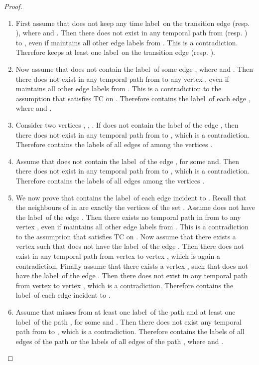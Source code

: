 \documentclass[a4paper,UKenglish]{article}
\begin{document}
\begin{proof}
\begin{enumerate}[label=(\alph*)]
\item First assume that  does not keep any time label~on
the transition edge  (resp. ), where  and . Then there does not exist in  any temporal path from 
 (resp. ) to , even if  maintains all other edge labels from . This is a
contradiction. Therefore  keeps at least one label~on the
transition edge  (resp. ).

\item Now assume that  does not contain the label~of some
edge , where  and . Then there does not exist in  any temporal path from  to any vertex , even if 
maintains all other edge labels from . This is a
contradiction to the assumption that  satisfies TC on . Therefore  contains the label~of each edge , where  and .

\item Consider two vertices , , . If  does not contain the label
of the edge , then there does not exist in  any temporal path from  to , which is a
contradiction. Therefore  contains the labels of all edges of  among the vertices .

\item Assume that  does not contain the label~of the edge , for some  and. Then there does not exist in  any temporal
path from  to , which is a contradiction.
Therefore  contains the labels of all edges among the vertices .

\item We now prove that  contains the label~of each edge
incident to . Recall that the neighbours of  in  are
exactly the vertices of the set . Assume  does not have the label~of the edge . Then
there exists no temporal path in  from  to any vertex , even if  maintains all other edge labels from 
. This is a contradiction to the assumption that 
satisfies TC on . Now assume that there exists a
vertex  such that  does not have the label~of the edge . Then there does not exist in  any temporal path from vertex  to vertex , which is again a contradiction. Finally assume that
there exists a vertex , such that  does not
have the label~of the edge . Then there does not exist
in  any temporal path from vertex  to vertex , which is a contradiction. Therefore  contains the
label~of each edge incident to .

\item Assume that  misses from  at least
one label~of the path  and at least one label~of the path , for some  and . Then there does
not exist any temporal path from  to , which is a
contradiction. Therefore  contains the labels of all edges of the
path  or the labels of all edges of the path , where  and .
\end{enumerate}
\end{proof}
\end{document}
